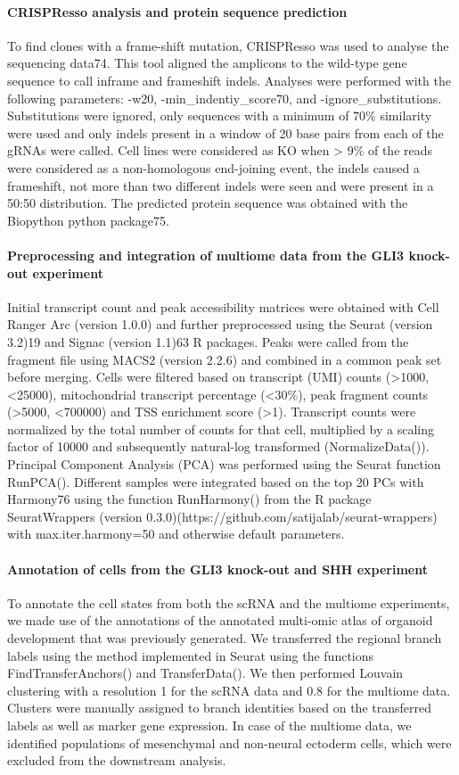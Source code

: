 \paragraph{CRISPResso analysis and protein sequence prediction}
To find clones with a frame-shift mutation, CRISPResso was used to analyse the sequencing data74. This tool aligned the amplicons to the wild-type gene sequence to call inframe and frameshift indels. Analyses were performed with the following parameters: -w20, -min\_indentiy\_score70, and -ignore\_substitutions. Substitutions were ignored, only sequences with a minimum of 70\% similarity were used and only indels present in a window of 20 base pairs from each of the gRNAs were called. Cell lines were considered as KO when > 9\% of the reads were considered as a non-homologous end-joining event, the indels caused a frameshift, not more than two different indels were seen and were present in a 50:50 distribution. The predicted protein sequence was obtained with the Biopython python package75.
 
\paragraph{Preprocessing and integration of multiome data from the GLI3 knock-out experiment}
Initial transcript count and peak accessibility matrices were obtained with Cell Ranger Arc (version 1.0.0) and further preprocessed using the Seurat (version 3.2)19 and Signac (version 1.1)63 R packages. Peaks were called from the fragment file using MACS2 (version 2.2.6) and combined in a common peak set before merging. Cells were filtered based on transcript (UMI) counts (>1000, <25000), mitochondrial transcript percentage (<30\%), peak fragment counts (>5000, <700000) and TSS enrichment score (>1). Transcript counts were normalized by the total number of counts for that cell, multiplied by a scaling factor of 10000 and subsequently natural-log transformed (NormalizeData()).  Principal Component Analysis (PCA) was performed using the Seurat function RunPCA(). Different samples were integrated based on the top 20 PCs with Harmony76 using the function RunHarmony() from the R package SeuratWrappers (version 0.3.0)(https://github.com/satijalab/seurat-wrappers)  with max.iter.harmony=50 and otherwise default parameters.
 
\paragraph{Annotation of cells from the GLI3 knock-out and SHH experiment}
To annotate the cell states from both the scRNA and the multiome experiments, we made use of the annotations of the annotated multi-omic atlas of organoid development that was previously generated. We transferred the regional branch labels using the method implemented in Seurat using the functions FindTransferAnchors() and TransferData(). We then performed Louvain clustering with a resolution 1 for the scRNA data and 0.8 for the multiome data. Clusters were manually assigned to branch identities based on the transferred labels as well as marker gene expression. In case of the multiome data, we identified populations of mesenchymal and non-neural ectoderm cells, which were excluded from the downstream analysis.
 

